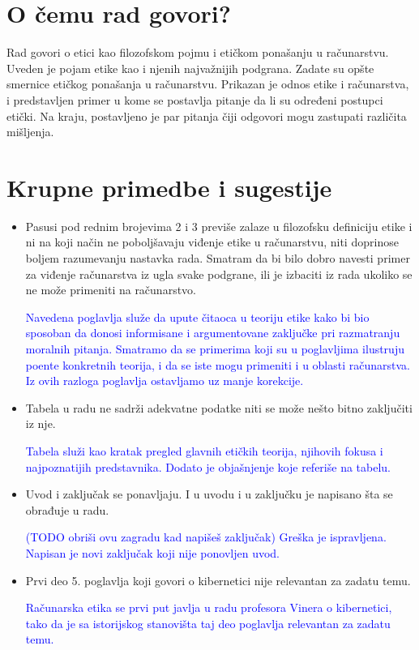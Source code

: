 \documentclass[a4paper]{report}
\newcommand{\odgovor}[1]{\textcolor{blue}{#1}}
\begin{document}
\section{O čemu rad govori?}

Rad govori o etici kao filozofskom pojmu i etičkom ponašanju u računarstvu. Uveden je pojam etike kao i njenih najvažnijih podgrana. Zadate su opšte smernice etičkog ponašanja u računarstvu. Prikazan je odnos etike i računarstva, i predstavljen primer u kome se postavlja pitanje da li su određeni postupci etički. Na kraju, postavljeno je par pitanja čiji odgovori mogu zastupati različita mišljenja.


\section{Krupne primedbe i sugestije}
\begin{itemize}
    \item Pasusi pod rednim brojevima 2 i 3 previše zalaze u filozofsku definiciju etike i ni na koji način ne poboljšavaju viđenje etike u računarstvu, niti doprinose boljem razumevanju nastavka rada. Smatram da bi bilo dobro navesti primer za viđenje računarstva iz ugla svake podgrane, ili je izbaciti iz rada ukoliko se ne može primeniti na računarstvo.
    
    \odgovor{Navedena poglavlja služe da upute čitaoca u teoriju etike kako bi bio sposoban da donosi informisane i argumentovane zaključke pri razmatranju moralnih pitanja. Smatramo da se primerima koji su u poglavljima ilustruju poente konkretnih teorija, i da se iste mogu primeniti i u oblasti računarstva. Iz ovih razloga poglavlja ostavljamo uz manje korekcije. } 
    
    
    \item Tabela u radu ne sadrži adekvatne podatke niti se može nešto bitno zaključiti iz nje.

\odgovor{Tabela služi kao kratak pregled glavnih etičkih teorija, njihovih fokusa i najpoznatijih predstavnika. Dodato je objašnjenje koje referiše na tabelu. }

    \item Uvod i zaključak se ponavljaju. I u uvodu i u zaključku je napisano šta se obrađuje u radu.
    
    \odgovor{(TODO obriši ovu zagradu kad napišeš zaključak) Greška je ispravljena. Napisan je novi zaključak koji nije ponovljen uvod.}
    
    \item Prvi deo 5. poglavlja koji govori o kibernetici nije relevantan za zadatu temu.
    
    \odgovor{Računarska etika se prvi put javlja u radu profesora Vinera o kibernetici, tako da je sa istorijskog stanovišta taj deo poglavlja relevantan za zadatu temu.}

\end{itemize}
\end{document}
